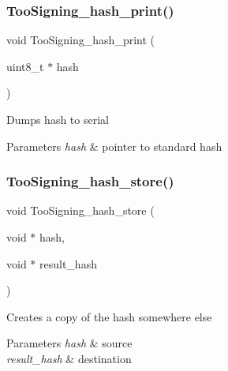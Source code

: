 \subsubsection{\texorpdfstring{Too\+Signing\+\_\+hash\+\_\+print()}{TooSigning\_hash\_print()}}
{\footnotesize\ttfamily void Too\+Signing\+\_\+hash\+\_\+print (\begin{DoxyParamCaption}\item[{uint8\+\_\+t $\ast$}]{hash }\end{DoxyParamCaption})}

Dumps hash to serial


\begin{DoxyParams}{Parameters}
{\em hash} & pointer to standard hash \\
\hline
\end{DoxyParams}
\mbox{\label{group__TOOSIGNING__HASHING_gae743dd1289d92f915352e40b047b4cc8}} 
\subsubsection{\texorpdfstring{Too\+Signing\+\_\+hash\+\_\+store()}{TooSigning\_hash\_store()}}
{\footnotesize\ttfamily void Too\+Signing\+\_\+hash\+\_\+store (\begin{DoxyParamCaption}\item[{void $\ast$}]{hash,  }\item[{void $\ast$}]{result\+\_\+hash }\end{DoxyParamCaption})}

Creates a copy of the hash somewhere else


\begin{DoxyParams}{Parameters}
{\em hash} & source \\
\hline
{\em result\+\_\+hash} & destination \\
\hline
\end{DoxyParams}
